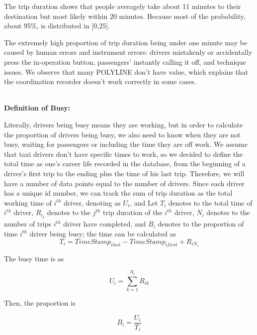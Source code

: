 \documentclass[11pt]{article}
\begin{document}
\par
The trip duration shows that people averagely take about 11 minutes to their destination but most likely within
 20 minutes. Because most of the probability, about 95\%, is distributed in [0,25].
\par
The extremely high proportion of trip duration being under one minute may be caused by human errors and instrument
 errors: drivers mistakenly or accidentally press the in-operation button, passengers' instantly calling it off,
 and technique issues. We observe that many POLYLINE don't have value, which explains that the coordination
 recorder doesn't work correctly in some cases. 


\\
\textbf{Definition of Busy:}

\par
Literally, drivers being busy means they are working, but in order to calculate the proportion of drivers being
 busy, we also need to know when they are not busy, waiting for passengers or including the time they are off work.
 We assume that taxi drivers don't have specific times to work, so we decided to define the total time as one's
 career life recorded in the database, from the beginning of a driver's first trip to the ending plus the time of
his last trip. Therefore, we will have a number of data points equal to the number of drivers. Since each driver
 has a unique id number, we can track the sum of trip duration as the total working time 
of $i^{th}$ driver, denoting as $U_{i}$, and Let $T_i$ denotes to the total time of $i^{th}$ driver, $R_{i_j}$ denotes
 to the $j^{th}$ trip duration of the $i^{th}$ driver, $N_i$ denotes to the number of trips $i^{th}$ driver have
 completed, and $B_i$ denotes to the proportion of time $i^{th}$ driver being busy; the time can be calculated as
\begin{equation}
T_i =TimeStamp_{i last}-TimeStamp_{i first} +R_{iN_i}
\end{equation}

\par
The busy time is as

\begin{equation}
U_i = \sum_{k=1}^{N_i} R_{ik}
\end{equation}

\par
Then, the proportion is

\begin{equation}
B_i = \frac{U_i}{T_i}
\end{equation}
\end{document}
